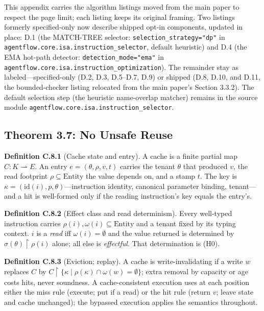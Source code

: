 \documentclass[
  11pt,
]{article}
\begin{document}
This appendix carries the algorithm listings moved from the main paper
to respect the page limit; each listing keeps its original framing. Two
listings formerly specified-only now describe shipped opt-in components,
updated in place: D.1 (the MATCH-TREE selector:
\texttt{selection\_strategy="dp"} in
\texttt{agentflow.core.isa.instruction\_selector}, default heuristic)
and D.4 (the EMA hot-path detector: \texttt{detection\_mode="ema"} in
\texttt{agentflow.core.isa.instruction\_optimization}). The remainder
stay as labeled---specified-only (D.2, D.3, D.5--D.7, D.9) or shipped
(D.8, D.10, and D.11, the bounded-checker listing relocated from the
main paper's Section 3.3.2). The default selection step (the heuristic
name-overlap matcher) remains in the source module
\texttt{agentflow.core.isa.instruction\_selector}.

\subsection{Theorem 3.7: No Unsafe
Reuse}\label{theorem-3.7-no-unsafe-reuse}

\textbf{Definition C.8.1} (Cache state and entry). A cache is a finite
partial map \(C : K \rightharpoonup E\). An entry
\(e=(\theta,\rho,v,t)\) carries the tenant \(\theta\) that produced
\(v\), the read footprint \(\rho \subseteq \mathrm{Entity}\) the value
depends on, and a stamp \(t\). The key is
\(\kappa=(\mathrm{id}(i), p, \theta)\)---instruction identity, canonical
parameter binding, tenant---and a hit is well-formed only if the reading
instruction's key equals the entry's.

\textbf{Definition C.8.2} (Effect class and read determinism). Every
well-typed instruction carries
\(\rho(i), \omega(i) \subseteq \mathrm{Entity}\) and a tenant fixed by
its typing context. \(i\) is a \emph{read} iff \(\omega(i)=\emptyset\)
and the value returned is determined by
\(\sigma(\theta)\!\restriction\!\rho(i)\) alone; all else is
\emph{effectful}. That determination is (H0).

\textbf{Definition C.8.3} (Eviction; replay). A cache is
write-invalidating if a write \(w\) replaces \(C\) by
\(C\!\restriction\!\{\kappa \mid \rho(\kappa) \cap \omega(w) = \emptyset\}\);
extra removal by capacity or age costs hits, never soundness. A
cache-consistent execution uses at each position either the miss rule
(execute; put if a read) or the hit rule (return \(v\); leave state and
cache unchanged); the bypassed execution applies the semantics
throughout.
\end{document}
